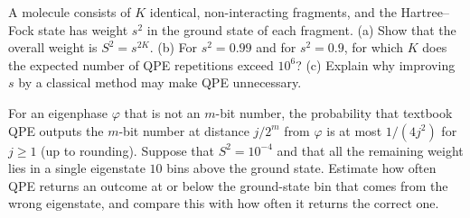 \documentclass[handoutsbeamer.tex]{subfiles}
\begin{document}
\begin{frame}
\begin{exe}
A molecule consists of $K$ identical, non-interacting fragments, and the Hartree--Fock state has weight $s^2$ in the ground state of each fragment. (a) Show that the overall weight is $S^2 = s^{2K}$. (b) For $s^2 = 0.99$ and for $s^2 = 0.9$, for which $K$ does the expected number of QPE repetitions exceed $10^6$? (c) Explain why improving $s$ by a classical method may make QPE unnecessary.
\end{exe}
\begin{exe}[Leakage]
For an eigenphase $\varphi$ that is not an $m$-bit number, the probability that textbook QPE outputs the $m$-bit number at distance $j/2^m$ from $\varphi$ is at most $1/(4j^2)$ for $j\ge1$ (up to rounding). Suppose that $S^2 = 10^{-4}$ and that all the remaining weight lies in a single eigenstate $10$ bins above the ground state. Estimate how often QPE returns an outcome at or below the ground-state bin that comes from the wrong eigenstate, and compare this with how often it returns the correct one.
\end{exe}
\end{frame}

\begin{frame}[allowframebreaks]
\biblio
\end{frame}
\end{document}

